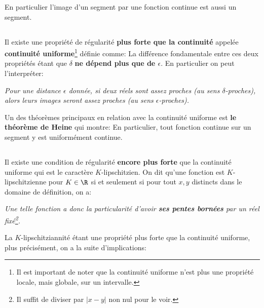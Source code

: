 En particulier l'image d'un segment par une fonction continue est aussi un segment.

\subsection*{}

Il existe une propriété de régularité \textbf{plus forte que la continuité} appelée \textbf{continuité uniforme}\footnote[2]{Il est important de noter que la continuité uniforme n'est plus une propriété locale, mais globale, sur un intervalle.} définie comme:
La différence fondamentale entre ces deux propriétés étant que \(\delta\) \textbf{ne dépend plus que de \(\epsilon\)}. En particulier on peut l'interpréter:
\begin{center}
   \textit{Pour une distance \(\epsilon\) donnée, si deux réels sont assez proches (au sens \(\delta\)-proches), alors leurs images seront assez proches (au sens \(\epsilon\)-proches).}
\end{center}

Un des théorèmes principaux en relation avec la continuité uniforme est \textbf{le théorème de Heine} qui montre:
En particulier, tout fonction continue sur un segment y est uniformément continue.
\pagebreak

\subsection*{}

Il existe une condition de régularité \textbf{encore plus forte} que la continuité uniforme qui est le caractère \(K\)-lipschitzien. On dit qu'une fonction est \(K\)-lipschitzienne pour \(K \in \R\) si et seulement si pour tout \(x, y\) distincts dans le domaine de définition, on a:
\begin{center}
   \textit{
      Une telle fonction a donc la particularité d'avoir \textbf{ses pentes bornées} par un réel fixé\footnote[1]{Il suffit de diviser par \(|x - y|\) non nul pour le voir.}.
   }
\end{center}
La \(K\)-lipschitziannité étant une propriété plus forte que la continuité uniforme, plus précisément, on a la suite d'implications:

